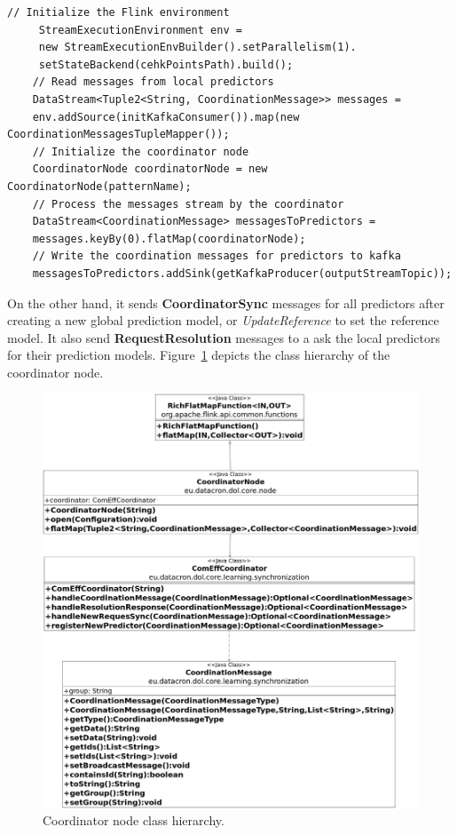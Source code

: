 \begin{center}
	\centering
\begin{lstlisting}[caption={The coordinator Flink program.},label={algonline:flink2},frame=single]
	// Initialize the Flink environment	 
	 StreamExecutionEnvironment env =
	 new StreamExecutionEnvBuilder().setParallelism(1).
	 setStateBackend(cehkPointsPath).build();	 
	// Read messages from local predictors
	DataStream<Tuple2<String, CoordinationMessage>> messages =
	env.addSource(initKafkaConsumer()).map(new CoordinationMessagesTupleMapper());	
	// Initialize the coordinator node
	CoordinatorNode coordinatorNode = new CoordinatorNode(patternName);	
	// Process the messages stream by the coordinator
	DataStream<CoordinationMessage> messagesToPredictors =
	messages.keyBy(0).flatMap(coordinatorNode);	
	// Write the coordination messages for predictors to kafka
	messagesToPredictors.addSink(getKafkaProducer(outputStreamTopic));

\end{lstlisting}
\end{center}

 On the other hand, it sends \textbf{CoordinatorSync} messages for all predictors after creating a new global prediction model, or \textit{UpdateReference} to set the reference model. It also send  \textbf{RequestResolution} messages to a ask the local predictors for their prediction models. Figure~\ref{fig:coord_class_diagram} depicts the  class hierarchy of the coordinator node.
 
 \begin{figure}[H]
	\centering
	\includegraphics[width=\textwidth,height=\linewidth]{chapters/figures/coordinator_diagram.png}
	
	\caption{Coordinator node class hierarchy.}
	\label{fig:coord_class_diagram}
\end{figure}